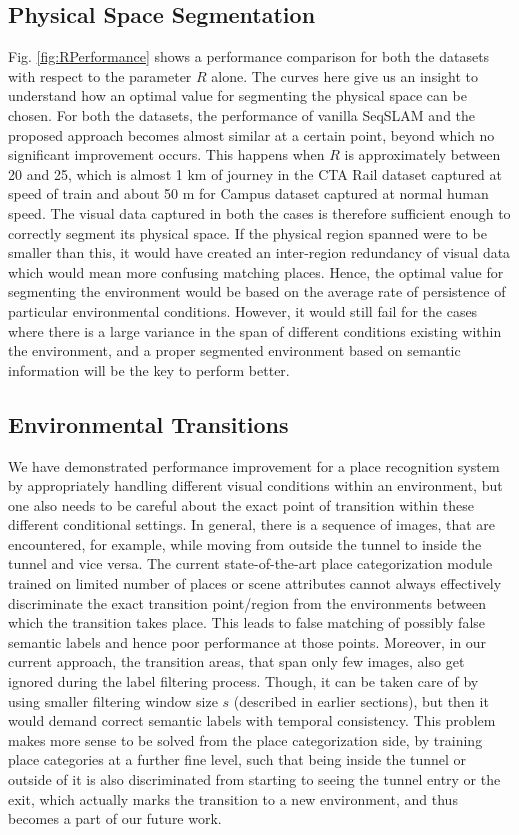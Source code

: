 \documentclass[letterpaper, 10 pt, conference]{ieeeconf}  %
\begin{document}
\subsection{Physical Space Segmentation}
Fig. \ref{fig:RPerformance} shows a performance comparison for both the datasets with respect to the parameter $R$ alone. The curves here give us an insight to understand how an optimal value for segmenting the physical space can be chosen. For both the datasets, the performance of vanilla SeqSLAM and the proposed approach becomes almost similar at a certain point, beyond which no significant improvement occurs. This happens when $R$ is approximately between 20 and 25, which is almost 1 km of journey in the CTA Rail dataset captured at speed of train and about 50 m for Campus dataset captured at normal human speed. The visual data captured in both the cases is therefore sufficient enough to correctly segment its physical space. If the physical region spanned were to be smaller than this, it would have created an inter-region redundancy of visual data which would mean more confusing matching places. Hence, the optimal value for segmenting the environment would be based on the average rate of persistence of particular environmental conditions. However, it would still fail for the cases where there is a large variance in the span of different conditions existing within the environment, and a proper segmented environment based on semantic information will be the key to perform better.

\subsection{Environmental Transitions}
We have demonstrated performance improvement for a place recognition system by appropriately handling different visual conditions within an environment, but one also needs to be careful about the exact point of transition within these different conditional settings. In general, there is a sequence of images, that are encountered, for example, while moving from outside the tunnel to inside the tunnel and vice versa. The current state-of-the-art place categorization module trained on limited number of places or scene attributes cannot always effectively discriminate the exact transition point/region from the environments between which the transition takes place. This leads to false matching of possibly false semantic labels and hence poor performance at those points. Moreover, in our current approach, the transition areas, that span only few images, also get ignored during the label filtering process. Though, it can be taken care of by using smaller filtering window size $s$ (described in earlier sections), but then it would demand correct semantic labels with temporal consistency. This problem makes more sense to be solved from the place categorization side, by training place categories at a further fine level, such that being inside the tunnel or outside of it is also discriminated from starting to seeing the tunnel entry or the exit, which actually marks the transition to a new environment, and thus becomes a part of our future work.
\end{document}
